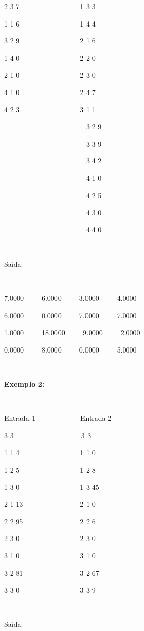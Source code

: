 \documentclass{article}
\begin{document}
2 3 7~~~~~~~~~~~~~~~~~1 3 3

1 1 6~~~~~~~~~~~~~~~~~1 4 4

3 2 9~~~~~~~~~~~~~~~~~2 1 6

1 4 0~~~~~~~~~~~~~~~~~2 2 0

2 1 0~~~~~~~~~~~~~~~~~2 3 0

4 1 0~~~~~~~~~~~~~~~~~2 4 7

4 2 3~~~~~~~~~~~~~~~~~3 1 1

~~~~~~~~~~~~~~~~~~~~~~~3 2 9

~~~~~~~~~~~~~~~~~~~~~~~3 3 9

~~~~~~~~~~~~~~~~~~~~~~~3 4 2

~~~~~~~~~~~~~~~~~~~~~~~4 1 0

~~~~~~~~~~~~~~~~~~~~~~~4 2 5

~~~~~~~~~~~~~~~~~~~~~~~4 3 0

~~~~~~~~~~~~~~~~~~~~~~~4 4 0 

~~~~~~~~~~~~~~~~~~~~~~~~~~~~~~~

Saída:

~~~~~~~~~~~~~~~~~~~~~~~~~~~~~~~

7.0000~~~~~6.0000~~~~~3.0000~~~~~4.0000

6.0000~~~~~0.0000~~~~~7.0000~~~~~7.0000

1.0000~~~~~18.0000~~~~~9.0000~~~~~2.0000

0.0000~~~~~8.0000~~~~~0.0000~~~~~5.0000

~~~~~~~~~~~~~~~~~~~~~~~~~~~~~~~

\textbf{Exemplo 2:}

~~~~~~~~~~~~~~~~~~~~~~~~~~~~~~~

Entrada 1 ~~~~~~~~~~~~Entrada 2 

3 3~~~~~~~~~~~~~~~~~~~3 3

1 1 4~~~~~~~~~~~~~~~~~1 1 0               

1 2 5~~~~~~~~~~~~~~~~~1 2 8

1 3 0~~~~~~~~~~~~~~~~~1 3 45

2 1 13~~~~~~~~~~~~~~~~2 1 0

2 2 95~~~~~~~~~~~~~~~~2 2 6

2 3 0~~~~~~~~~~~~~~~~~2 3 0

3 1 0~~~~~~~~~~~~~~~~~3 1 0

3 2 81~~~~~~~~~~~~~~~~3 2 67

3 3 0~~~~~~~~~~~~~~~~~3 3 9

~~~~~~~~~~~~~~~~~~~~~~~~~~~~~~~

Saída:
\end{document}
